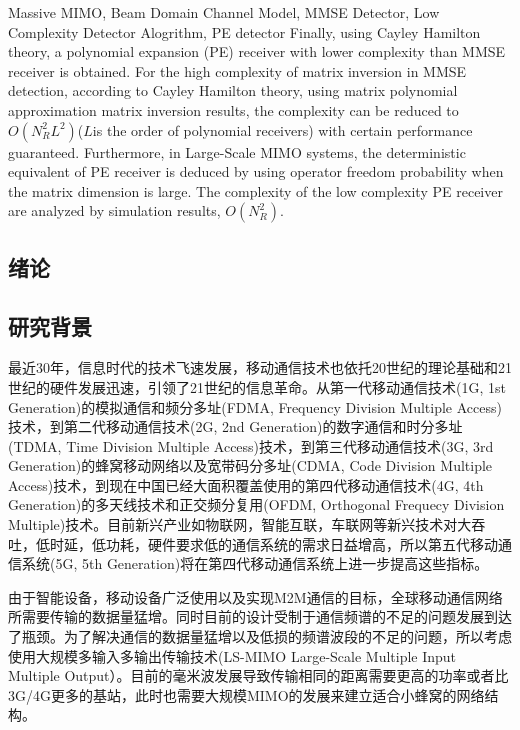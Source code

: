 \documentclass[bachelor,nocolorlinks, printoneside]{seuthesis} %
\begin{document}
\begin{englishabstract}{Massive MIMO, Beam Domain Channel Model, MMSE Detector, Low Complexity Detector Alogrithm, PE detector}
Finally, using Cayley Hamilton theory, a polynomial expansion (PE) receiver with lower complexity than MMSE receiver is obtained. For the high complexity of matrix inversion in MMSE detection, according to Cayley Hamilton theory, using matrix polynomial approximation matrix inversion results, the complexity can be reduced to $O (N_R ^ 2L ^ 2) $($L $is the order of polynomial receivers) with certain performance guaranteed. Furthermore, in Large-Scale MIMO systems, the deterministic equivalent of PE receiver is deduced by using operator freedom probability when the matrix dimension is large. The complexity of the low complexity PE receiver are analyzed by simulation results, $O(N_R^2)$.
\end{englishabstract}

\tableofcontents


\begin{Main} %

\chapter{绪论}
\section{研究背景}
最近30年，信息时代的技术飞速发展，移动通信技术也依托20世纪的理论基础和21世纪的硬件发展迅速，引领了21世纪的信息革命。从第一代移动通信技术(1G, 1st Generation)的模拟通信和频分多址(FDMA, Frequency Division Multiple Access)技术，到第二代移动通信技术(2G, 2nd Generation)的数字通信和时分多址(TDMA, Time Division Multiple Access)技术，到第三代移动通信技术(3G, 3rd Generation)的蜂窝移动网络以及宽带码分多址(CDMA, Code Division Multiple Access)技术，到现在中国已经大面积覆盖使用的第四代移动通信技术(4G, 4th Generation)的多天线技术和正交频分复用(OFDM, Orthogonal Frequecy Division Multiple)技术。目前新兴产业如物联网，智能互联，车联网等新兴技术对大吞吐，低时延，低功耗，硬件要求低的通信系统的需求日益增高，所以第五代移动通信系统(5G, 5th Generation)将在第四代移动通信系统上进一步提高这些指标。

由于智能设备，移动设备广泛使用以及实现M2M通信的目标，全球移动通信网络所需要传输的数据量猛增。同时目前的设计受制于通信频谱的不足的问题发展到达了瓶颈。为了解决通信的数据量猛增以及低损的频谱波段的不足的问题，所以考虑使用大规模多输入多输出传输技术(LS-MIMO Large-Scale Multiple Input Multiple Output）。目前的毫米波发展导致传输相同的距离需要更高的功率或者比3G/4G更多的基站，此时也需要大规模MIMO的发展来建立适合小蜂窝的网络结构。\cite{zhang2018recent}


\end{Main}
\end{document}
